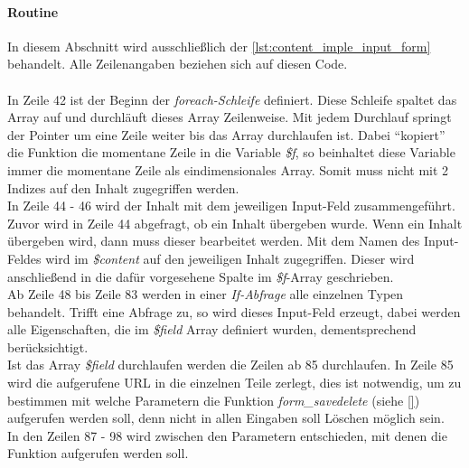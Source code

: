\paragraph{Routine}
In diesem Abschnitt wird ausschließlich der \autoref{lst:content_imple_input_form} behandelt. Alle Zeilenangaben beziehen sich auf diesen Code.\\
\\
In Zeile 42 ist der Beginn der \textit{foreach-Schleife} definiert. Diese Schleife spaltet das Array auf und durchläuft dieses Array Zeilenweise. Mit jedem Durchlauf springt der Pointer um eine Zeile weiter bis das Array durchlaufen ist. Dabei \enquote{kopiert} die Funktion die momentane Zeile in die Variable \textit{\$f}, so beinhaltet diese Variable immer die momentane Zeile als eindimensionales Array. Somit muss nicht mit 2 Indizes auf den Inhalt zugegriffen werden.\\
In Zeile 44 - 46 wird der Inhalt mit dem jeweiligen Input-Feld zusammengeführt. Zuvor wird in Zeile 44 abgefragt, ob ein Inhalt übergeben wurde. Wenn ein Inhalt übergeben wird, dann muss dieser bearbeitet werden. Mit dem Namen des Input-Feldes wird im \textit{\$content} auf den jeweiligen Inhalt zugegriffen. Dieser wird anschließend in die dafür vorgesehene Spalte im \textit{\$f}-Array geschrieben.\\
Ab Zeile 48 bis Zeile 83 werden in einer \textit{If-Abfrage} alle einzelnen Typen behandelt. Trifft eine Abfrage zu, so wird dieses Input-Feld erzeugt, dabei werden alle Eigenschaften, die im \textit{\$field} Array definiert wurden, dementsprechend berücksichtigt.\\
Ist das Array \textit{\$field} durchlaufen werden die Zeilen ab 85 durchlaufen. In Zeile 85 wird die aufgerufene URL in die einzelnen Teile zerlegt, dies ist notwendig, um zu bestimmen mit welche Parametern die Funktion \textit{form\_savedelete} (siehe \autoref{}) aufgerufen werden soll, denn nicht in allen Eingaben soll Löschen möglich sein.\\
In den Zeilen 87 - 98 wird zwischen den Parametern entschieden, mit denen die Funktion aufgerufen werden soll.

